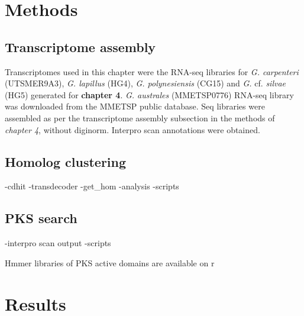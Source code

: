 \documentclass[12pt]{article}
\begin{document}
\newpage
\section*{Methods}
\subsection*{Transcriptome assembly}
Transcriptomes used in this chapter were the RNA-seq libraries for \textit{G. carpenteri} (UTSMER9A3), \textit{G. lapillus} (HG4), \textit{G. polynesiensis} (CG15) and \textit{G.} cf. \textit{silvae} (HG5) generated for \textbf{chapter 4}. 
\textit{G. australes} (MMETSP0776) RNA-seq library was downloaded from the MMETSP public database. 
Seq libraries were assembled as per the transcriptome assembly subsection in the methods of \textit{chapter 4}, without diginorm. 
Interpro scan annotations were obtained.

\subsection*{Homolog clustering}
-cdhit
-transdecoder
-get\_hom
-analysis
-scripts

\subsection*{PKS search}
-interpro scan output 
-scripts

Hmmer libraries of PKS active domains are available on r

\newpage
\section*{Results}
\FloatBarrier
\end{document}
